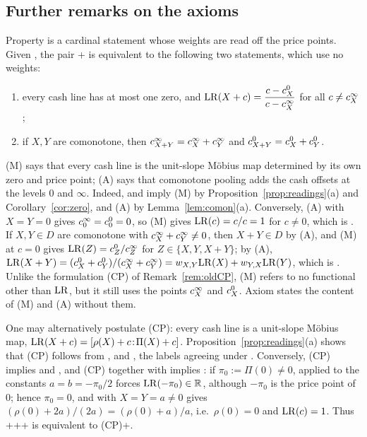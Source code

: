 

\subsection{Further remarks on the axioms}\label{supp:remarks}

\begin{remark}\label{rem:weightfree}
Property \axCM{} is a cardinal statement whose weights are read off the price points. Given \axP, the pair
\axN+\axCM{} is equivalent to the following two statements, which use no weights:
\begin{enumerate}[label=(\Alph*),nosep]
\item[(M)] every cash line has at most one zero, and $\mathrm{LR}(X+c)=\dfrac{c-c^{0}_{X}}{c-c^{\infty}_{X}}$ for all $c\ne c^{\infty}_{X}$;
\item[(A)] if $X,Y$ are comonotone, then $c^{\infty}_{X+Y}=c^{\infty}_{X}+c^{\infty}_{Y}$ and $c^{0}_{X+Y}=c^{0}_{X}+c^{0}_{Y}$.
\end{enumerate}
(M) says that every cash line is the unit-slope Möbius map determined by its own zero and price point; (A) says
that comonotone pooling adds the cash offsets at the levels $0$ and $\infty$. Indeed, \axN{} and \axCM{} imply (M) by
Proposition~\ref{prop:readings}(a) and Corollary~\ref{cor:zero}, and (A) by Lemma~\ref{lem:comon}(a). Conversely,
(A) with $X=Y=0$ gives $c^{\infty}_{0}=c^{0}_{0}=0$, so (M) gives $\mathrm{LR}(c)=c/c=1$ for $c\ne0$, which is \axN. If $X,Y\in D$ are
comonotone with $c^{\infty}_{X}+c^{\infty}_{Y}\ne0$, then $X+Y\in D$ by (A), and (M) at $c=0$ gives
$\mathrm{LR}(Z)=c^{0}_{Z}/c^{\infty}_{Z}$ for $Z\in\{X,Y,X+Y\}$; by (A),
$\mathrm{LR}(X+Y)=(c^{0}_{X}+c^{0}_{Y})/(c^{\infty}_{X}+c^{\infty}_{Y})=w_{X,Y}\mathrm{LR}(X)+w_{Y,X}\mathrm{LR}(Y)$, which is \axCM. Unlike the formulation
(CP) of Remark~\ref{rem:oldCP}, (M) refers to no functional other than $\mathrm{LR}$, but it still uses the points
$c^{\infty}_{X}$ and $c^{0}_{X}$. Axiom \axR{} states the content of (M) and (A) without them.
\end{remark}

\begin{remark}\label{rem:oldCP}
One may alternatively postulate (CP): every cash line is a unit-slope Möbius map,
$\mathrm{LR}(X+c)=[\rho(X)+c\!:\!\Pi(X)+c]$. Proposition~\ref{prop:readings}(a) shows that (CP) follows from \axP,
\axN{} and \axCM, the labels agreeing under . Conversely, (CP) implies \axP{} and , and (CP) together
with \axCM{} implies \axN: if $\pi_0:=\Pi(0)\ne0$, \axCM{} applied to the constants $a=b=-\pi_0/2$ forces
$\mathrm{LR}(-\pi_0)\in\mathbb R$, although $-\pi_0$ is the price point of $0$; hence $\pi_0=0$, and \axCM{} with $X=Y=a\ne0$ gives
$(\rho(0)+2a)/(2a)=(\rho(0)+a)/a$, i.e.\ $\rho(0)=0$ and $\mathrm{LR}(c)=1$. Thus \axP+\axN+\axCM+ is equivalent to
(CP)+\axCM.
\end{remark}

